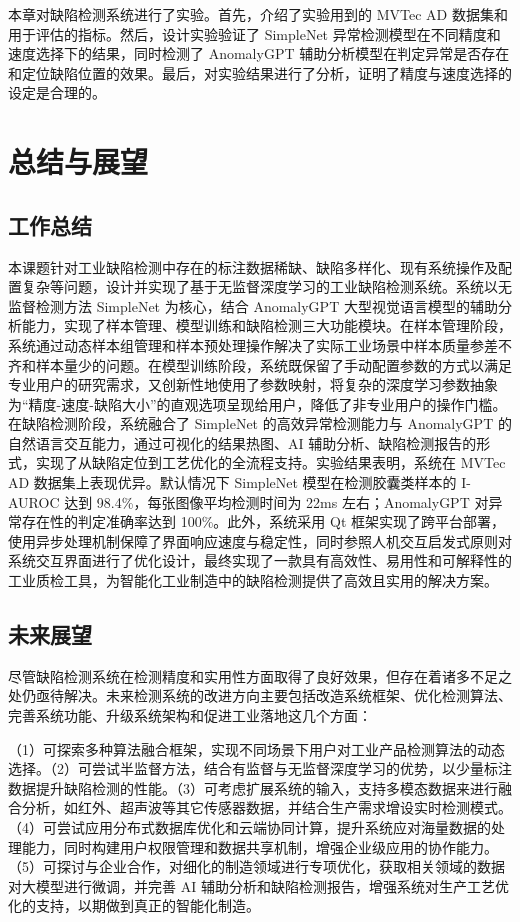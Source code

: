 \documentclass[
  ]{njuthesis}
\begin{document}
本章对缺陷检测系统进行了实验。首先，介绍了实验用到的 MVTec AD 数据集和用于评估的指标。然后，设计实验验证了 SimpleNet 异常检测模型在不同精度和速度选择下的结果，同时检测了 AnomalyGPT 辅助分析模型在判定异常是否存在和定位缺陷位置的效果。最后，对实验结果进行了分析，证明了精度与速度选择的设定是合理的。

\chapter{总结与展望}

\section{工作总结}

本课题针对工业缺陷检测中存在的标注数据稀缺、缺陷多样化、现有系统操作及配置复杂等问题，设计并实现了基于无监督深度学习的工业缺陷检测系统。系统以无监督检测方法 SimpleNet 为核心，结合 AnomalyGPT 大型视觉语言模型的辅助分析能力，实现了样本管理、模型训练和缺陷检测三大功能模块。在样本管理阶段，系统通过动态样本组管理和样本预处理操作解决了实际工业场景中样本质量参差不齐和样本量少的问题。在模型训练阶段，系统既保留了手动配置参数的方式以满足专业用户的研究需求，又创新性地使用了参数映射，将复杂的深度学习参数抽象为“精度-速度-缺陷大小”的直观选项呈现给用户，降低了非专业用户的操作门槛。在缺陷检测阶段，系统融合了 SimpleNet 的高效异常检测能力与 AnomalyGPT 的自然语言交互能力，通过可视化的结果热图、AI 辅助分析、缺陷检测报告的形式，实现了从缺陷定位到工艺优化的全流程支持。实验结果表明，系统在 MVTec AD 数据集上表现优异。默认情况下 SimpleNet 模型在检测胶囊类样本的 I-AUROC 达到 98.4\%，每张图像平均检测时间为 22ms 左右；AnomalyGPT 对异常存在性的判定准确率达到 100\%。此外，系统采用 Qt 框架实现了跨平台部署，使用异步处理机制保障了界面响应速度与稳定性，同时参照人机交互启发式原则对系统交互界面进行了优化设计，最终实现了一款具有高效性、易用性和可解释性的工业质检工具，为智能化工业制造中的缺陷检测提供了高效且实用的解决方案。

\section{未来展望}

尽管缺陷检测系统在检测精度和实用性方面取得了良好效果，但存在着诸多不足之处仍亟待解决。未来检测系统的改进方向主要包括改造系统框架、优化检测算法、完善系统功能、升级系统架构和促进工业落地这几个方面：

（1）可探索多种算法融合框架，实现不同场景下用户对工业产品检测算法的动态选择。（2）可尝试半监督方法，结合有监督与无监督深度学习的优势，以少量标注数据提升缺陷检测的性能。（3）可考虑扩展系统的输入，支持多模态数据来进行融合分析，如红外、超声波等其它传感器数据，并结合生产需求增设实时检测模式。（4）可尝试应用分布式数据库优化和云端协同计算，提升系统应对海量数据的处理能力，同时构建用户权限管理和数据共享机制，增强企业级应用的协作能力。（5）可探讨与企业合作，对细化的制造领域进行专项优化，获取相关领域的数据对大模型进行微调，并完善 AI 辅助分析和缺陷检测报告，增强系统对生产工艺优化的支持，以期做到真正的智能化制造。
\end{document}
